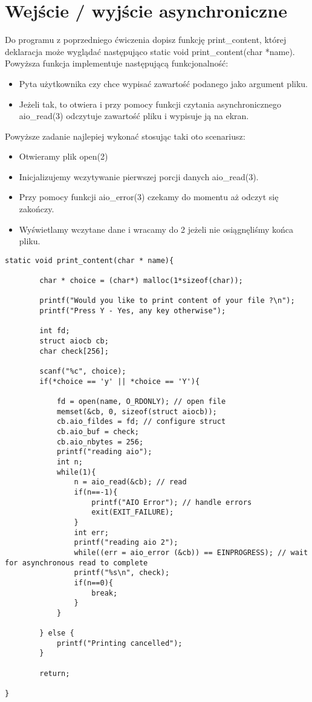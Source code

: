 \documentclass[a4paper,15pt]{article}
\newcommand{\assignment}[2]{
    \begin{tcolorbox}[colback=black!5!white,colframe=black,title={Zadanie #1}]
        #2
    \end{tcolorbox}
}
\begin{document}
\section{Wejście / wyjście asynchroniczne}
\assignment{}{
Do programu z poprzedniego ćwiczenia dopisz funkcję print\_content, której deklaracja może wyglądać następująco static void print\_content(char *name). Powyższa funkcja implementuje następującą funkcjonalność: 
\begin{itemize}
\item Pyta użytkownika czy chce wypisać zawartość podanego jako argument pliku.
\item Jeżeli tak, to otwiera i przy pomocy funkcji czytania asynchronicznego aio\_read(3) odczytuje zawartość pliku i wypisuje ją na ekran.
\end{itemize}
Powyższe zadanie najlepiej wykonać stosując taki oto scenariusz:
\begin{itemize}
\item Otwieramy plik open(2)
\item Inicjalizujemy wczytywanie pierwszej porcji danych aio\_read(3).
\item Przy pomocy funkcji aio\_error(3) czekamy do momentu aż odczyt się zakończy.
\item Wyświetlamy wczytane dane i wracamy do 2 jeżeli nie osiągnęliśmy końca pliku.
\end{itemize}
}

\begin{lstlisting}[style=CStyle, label=some-code,caption=print\_content]
static void print_content(char * name){
		
		char * choice = (char*) malloc(1*sizeof(char));
		
		printf("Would you like to print content of your file ?\n");
		printf("Press Y - Yes, any key otherwise");
		
		int fd;
		struct aiocb cb;
		char check[256];
		
		scanf("%c", choice);
		if(*choice == 'y' || *choice == 'Y'){
			
			fd = open(name, O_RDONLY); // open file
			memset(&cb, 0, sizeof(struct aiocb));
			cb.aio_fildes = fd; // configure struct
			cb.aio_buf = check;
			cb.aio_nbytes = 256;
			printf("reading aio");
			int n;
			while(1){
				n = aio_read(&cb); // read 
				if(n==-1){
					printf("AIO Error"); // handle errors
					exit(EXIT_FAILURE);
				}
				int err;
				printf("reading aio 2");
				while((err = aio_error (&cb)) == EINPROGRESS); // wait for asynchronous read to complete
				printf("%s\n", check);
				if(n==0){
					break;
				}
			}
				
		} else {
			printf("Printing cancelled");
		}
		
		return;
		
}
\end{lstlisting}
\end{document}
